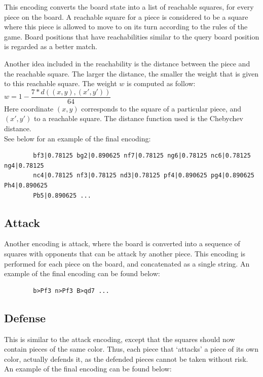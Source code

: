 \documentclass[11pt]{article}
\begin{document}
    This encoding converts the board state into a list of reachable squares, for every piece on the board. A reachable square for a piece is considered to be a square where this piece is allowed to move to on its turn according to the rules of the game. Board positions that have reachabilities similar to the query board position is regarded as a better match.

    Another idea included in the reachability is the distance between the piece and the reachable square. The larger the distance, the smaller the weight that is given to this reachable square.
    The weight $w$ is computed as follow:\\

    $w = 1 - \dfrac{7 * d((x,y),(x',y'))}{64}$ \\

    Here coordinate $(x,y)$ corresponds to the square of a particular piece, and $(x',y')$ to a reachable square. The distance function used is the Chebychev distance.\\
    See below for an example of the final encoding:

    \begin{verbatim}
        bf3|0.78125 bg2|0.890625 nf7|0.78125 ng6|0.78125 nc6|0.78125 ng4|0.78125
        nc4|0.78125 nf3|0.78125 nd3|0.78125 pf4|0.890625 pg4|0.890625 Ph4|0.890625
        Pb5|0.890625 ...
    \end{verbatim}

    \subsection{Attack}

    Another encoding is attack, where the board is converted into a sequence of squares with opponents that can be attack by another piece. This encoding is performed for each piece on the board, and concatenated as a single string. An example of the final encoding can be found below:

    \begin{verbatim}
        b>Pf3 n>Pf3 B>qd7 ...
    \end{verbatim}

    \subsection{Defense}

    This is similar to the attack encoding, except that the squares should now contain pieces of the same color. Thus, each piece that `attacks' a piece of its own color, actually defends it, as the defended pieces cannot be taken without risk. An example of the final encoding can be found below:
\end{document}
